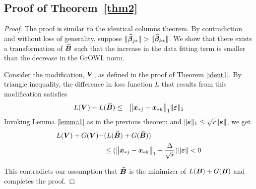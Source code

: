 \subsection*{Proof of Theorem~\ref{thm2}}
\begin{proof}
The proof is similar to the identical columns theorem. By contradiction and without loss
of generality, suppose $\|\widehat {\boldsymbol{\beta}}_{j {\ast}}\| > \|\widehat {\boldsymbol{\beta}}_{k {\ast}}\|$. We show
that there exists a transformation of $\widehat{\boldsymbol{B}}$ such that the increase in the data
fitting term is smaller than the decrease in the GrOWL norm. 

Consider the modification, $\boldsymbol{V}$, as defined in the proof of Theorem \ref{ident1}. By
triangle inequality, the difference in loss function $L$ that results from this
modification satisfies
\begin{eqnarray*}
L(\bm V) - L(\widehat{\bm B})  & \leq  & \bigl\|{\bm x}_{{\ast} j}- {\bm x}_{{\ast} k}\bigr\|_1  \|\boldsymbol{\varepsilon} \|_1
\end{eqnarray*}
Invoking Lemma \ref{lemma1} as in the previous theorem and $\| \boldsymbol{\varepsilon} \|_1 \leq \sqrt{r} \| \boldsymbol{\varepsilon} \|$,
we get
\begin{align*}
L(\boldsymbol{V}) + G(\boldsymbol{V}) - &( L(\widehat{\boldsymbol{B}}) + G(\widehat{\boldsymbol{B}}) ) \\
&\leq (\bigl\|{\bm x}_{{\ast} j}- {\bm x}_{{\ast} k}\bigr\|_1 -  \frac{\Delta}{\sqrt{r}}) \|\boldsymbol{\varepsilon}\| <  0
\end{align*}

This contradicts our assumption that $\widehat{\boldsymbol{B}}$ is the minimizer of $L(\boldsymbol{B}) + G(\boldsymbol{B})$
and completes the proof.
\end{proof}

